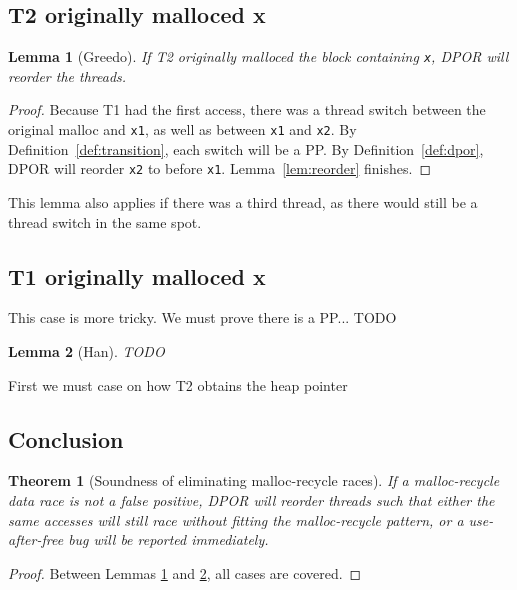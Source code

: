 \documentclass[pldi]{sigplanconf-pldi15}
\newtheorem{lemma}{Lemma}
\newtheorem{theorem}{Theorem}
\begin{document}
\subsection{T2 originally malloced x}

\begin{lemma}[Greedo]
	If T2 originally malloced the block containing {\tt x}, DPOR will reorder the threads.
	\label{lem:greedo}
\end{lemma}
\begin{proof}
Because T1 had the first access, there was a thread switch between the original malloc and {\tt x1}, as well as between {\tt x1} and {\tt x2}. By Definition~\ref{def:transition}, each switch will be a PP.
By Definition~\ref{def:dpor}, DPOR will reorder {\tt x2} to before {\tt x1}. Lemma~\ref{lem:reorder} finishes.
\end{proof}

This lemma also applies if there was a third thread, as there would still be a thread switch in the same spot.

\subsection{T1 originally malloced x}

This case is more tricky. We must prove there is a PP... TODO

\begin{lemma}[Han]
	TODO
	\label{lem:han}
\end{lemma}


First we must case on how T2 obtains the heap pointer

\subsection{Conclusion}

\begin{theorem}[Soundness of eliminating malloc-recycle races]
	If a malloc-recycle data race is not a false positive, DPOR will reorder threads such that either the same accesses will still race without fitting the malloc-recycle pattern, or a use-after-free bug will be reported immediately.
\end{theorem}
\begin{proof}
	Between Lemmas \ref{lem:greedo} and \ref{lem:han}, all cases are covered.
\end{proof}
\end{document}

